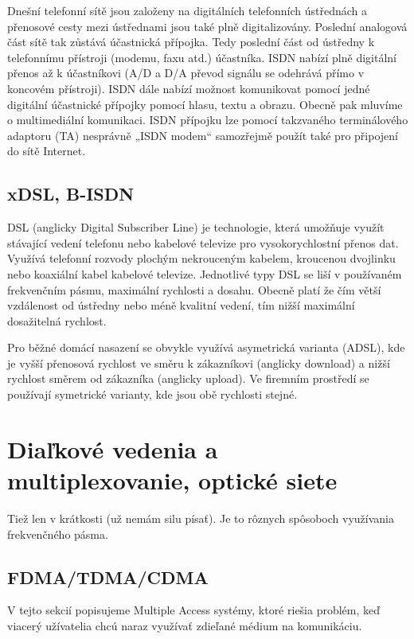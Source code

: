 \documentclass[10pt,a4paper]{article}
\begin{document}
Dnešní telefonní sítě jsou založeny na digitálních telefonních ústřednách a přenosové cesty mezi ústřednami jsou také plně digitalizovány. Poslední analogová část sítě tak zůstává účastnická přípojka. Tedy poslední část od ústředny k telefonnímu přístroji (modemu, faxu atd.) účastníka. ISDN nabízí plně digitální přenos až k účastníkovi (A/D a D/A převod signálu se odehrává přímo v koncovém přístroji). ISDN dále nabízí možnost komunikovat pomocí jedné digitální účastnické přípojky pomocí hlasu, textu a obrazu. Obecně pak mluvíme o multimediální komunikaci. ISDN přípojku lze pomocí takzvaného terminálového adaptoru (TA) nesprávně „ISDN modem“ samozřejmě použít také pro připojení do sítě Internet.

\subsection{xDSL, B-ISDN}     
  
DSL (anglicky Digital Subscriber Line) je technologie, která umožňuje využít stávající vedení telefonu nebo kabelové televize pro vysokorychlostní přenos dat. Využívá telefonní rozvody plochým nekrouceným kabelem, kroucenou dvojlinku nebo koaxiální kabel kabelové televize. Jednotlivé typy DSL se liší v používaném frekvenčním pásmu, maximální rychlosti a dosahu. Obecně platí že čím větší vzdálenost od ústředny nebo méně kvalitní vedení, tím nižší maximální dosažitelná rychlost.

Pro běžné domácí nasazení se obvykle využívá asymetrická varianta (ADSL), kde je vyšší přenosová rychlost ve směru k zákazníkovi (anglicky download) a nižší rychlost směrem od zákazníka (anglicky upload). Ve firemním prostředí se používají symetrické varianty, kde jsou obě rychlosti stejné.

\section{Diaľkové vedenia a multiplexovanie, optické siete}
Tiež len v krátkosti (už nemám silu písať). Je to rôznych spôsoboch využívania frekvenčného pásma. 

\subsection{FDMA/TDMA/CDMA}  

V tejto sekcií popisujeme Multiple Access systémy, ktoré riešia problém, keď viacerý užívatelia chcú naraz využívať zdieľané médium na komunikáciu. 
\end{document}
